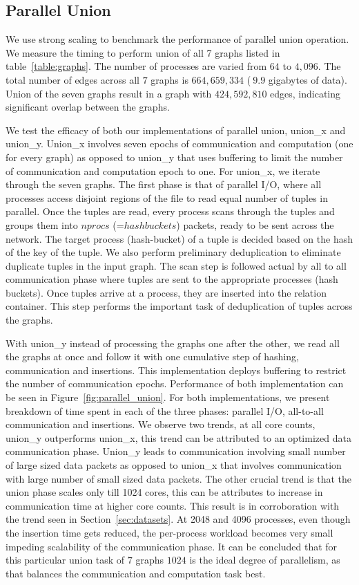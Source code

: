 \subsection{Parallel Union}
\label{sec:union}
We use strong scaling to benchmark the performance of parallel union operation. We measure the timing to perform union of all 7 graphs listed in table~\ref{table:graphs}. The number of processes are varied from $64$ to $4,096$. The total number of edges across all $7$ graphs is $664,659,334$ ($~9.9$ gigabytes of data). Union of the seven graphs result in a graph with $424,592,810$ edges, indicating significant overlap between the graphs.

We test the efficacy of both our implementations of parallel union, union\_x and union\_y. Union\_x involves seven epochs of communication and computation (one for every graph) as opposed to union\_y that uses buffering to limit the number of communication and computation epoch to one. For union\_x, we iterate through the seven graphs. The first phase is that of parallel I/O, where all processes access disjoint regions of the file to read equal number of tuples in parallel. Once the tuples are read, every process scans through the tuples and groups them into $nprocs$ (=$hashbuckets$) packets, ready to be sent across the network.
The target process (hash-bucket) of a tuple is decided based on the hash of the key of the tuple. We also perform preliminary deduplication to eliminate duplicate tuples in the input graph. The scan step is followed actual by all to all communication phase where tuples are sent to the appropriate processes (hash buckets). Once tuples arrive at a process, they are inserted into the relation container. This step performs the important task of deduplication of tuples across the graphs. 

With union\_y instead of processing the graphs one after the other, we read all the graphs at once and follow it with one cumulative step of hashing, communication and insertions. This implementation deploys buffering to restrict the number of communication epochs. Performance of both implementation can be seen in Figure~\ref{fig:parallel_union}. For both implementations, we present breakdown of time spent in each of the three phases: parallel I/O, all-to-all communication and insertions. We observe two trends, at all core counts, union\_y outperforms union\_x, this trend can be attributed to an optimized data communication phase. Union\_y leads to communication involving small number of large sized data packets as opposed to union\_x that involves communication with large number of small sized data packets. The other crucial trend is that the union phase scales only till 1024 cores, this can be attributes to increase in communication time at higher core counts. This result is in corroboration with the trend seen in Section~\ref{sec:datasets}. At 2048 and 4096 processes, even though the insertion time gets reduced, the per-process workload becomes very small impeding scalability of the communication phase. 
It can be concluded that for this particular union task of $7$ graphs $1024$ is the ideal degree of parallelism, as that balances the communication and computation task best.

